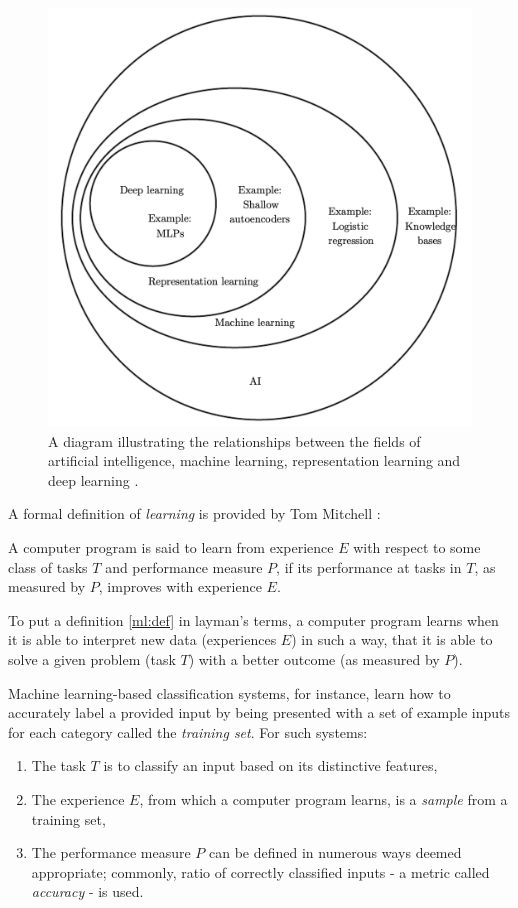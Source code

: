 \begin{figure}[]
\centering
\includegraphics[scale=0.35]{figures/ai_venn.png}
\caption{A diagram illustrating the relationships between the fields of artificial intelligence, machine learning, representation learning and deep learning \cite{goodfellow}.}
\label{ai:diagram}
\end{figure}

A formal definition of \textit{learning} is provided by Tom Mitchell \cite{mitchell_def_learn}:

\theoremstyle{definition}
\begin{definition}{}
\label{ml:def}
A computer program is said to learn from experience $E$ with respect to some class of tasks $T$ and performance measure $P$, if its performance at tasks in $T$, as measured by $P$, improves with experience $E$.
\end{definition}

To put a definition \ref{ml:def} in layman's terms, a computer program learns when it is able to interpret new data (experiences $E$) in such a way, that it is able to solve a given problem (task $T$) with a better outcome (as measured by $P$).

Machine learning-based classification systems, for instance, learn how to accurately label a provided input by being presented with a set of example inputs for each category called the \emph{training set}. For such systems:
\begin{enumerate}
\item The task $T$ is to classify an input based on its distinctive features,
\item The experience $E$, from which a computer program learns, is a \emph{sample} from a training set,
\item The performance measure $P$ can be defined in numerous ways deemed appropriate; commonly, ratio of correctly classified inputs - a metric called \textit{accuracy} - is used.
\end{enumerate}

